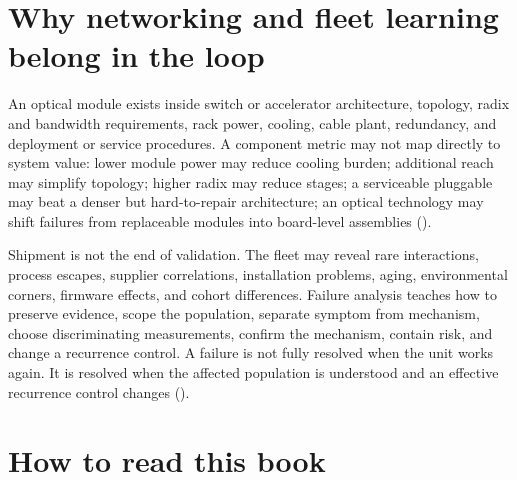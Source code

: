 \section{Why networking and fleet learning belong in the loop}

An optical module exists inside switch or accelerator architecture, topology,
radix and bandwidth requirements, rack power, cooling, cable plant, redundancy,
and deployment or service procedures. A component metric may not map directly to
system value: lower module power may reduce cooling burden; additional reach may
simplify topology; higher radix may reduce stages; a serviceable pluggable may
beat a denser but hard-to-repair architecture; an optical technology may shift
failures from replaceable modules into board-level assemblies
().

Shipment is not the end of validation. The fleet may reveal rare interactions,
process escapes, supplier correlations, installation problems, aging,
environmental corners, firmware effects, and cohort differences. Failure
analysis teaches how to preserve evidence, scope the population, separate
symptom from mechanism, choose discriminating measurements, confirm the
mechanism, contain risk, and change a recurrence control. A failure is not fully
resolved when the unit works again. It is resolved when the affected population
is understood and an effective recurrence control changes
().

\section{How to read this book}


